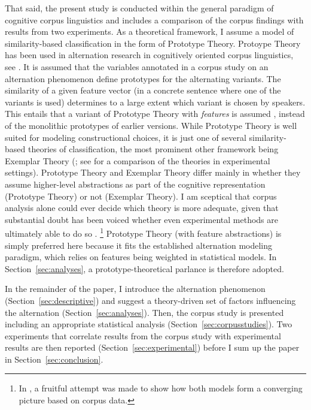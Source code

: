 \documentclass[USenglish]{article}
\begin{document}
That said, the present study is conducted within the general paradigm of cognitive corpus linguistics and includes a comparison of the corpus findings with results from two experiments.
As a theoretical framework, I assume a model of similarity-based classification in the form of Prototype Theory.
Protoype Theory has been used in alternation research in cognitively oriented corpus linguistics, see \cite{DivjakArppe2013,Gries2003}.
It is assumed that the variables annotated in a corpus study on an alternation phenomenon define prototypes for the alternating variants.
The similarity of a given feature vector (in a concrete sentence where one of the variants is used) determines to a large extent which variant is chosen by speakers.
This entails that a variant of Prototype Theory with \textit{features} is assumed \citep{Rosch1978}, instead of the monolithic prototypes of earlier versions.
While Prototype Theory is well suited for modeling constructional choices, it is just one of several similarity-based theories of classification, the most prominent other framework being Exemplar Theory (\citealp{MedinSchaffer1978,Hintzman1986}; see \citealp{StormsEa2000} for a comparison of the theories in experimental settings).
Prototype Theory and Exemplar Theory differ mainly in whether they assume higher-level abstractions as part of the cognitive representation (Prototype Theory) or not (Exemplar Theory).
I am sceptical that corpus analysis alone could ever decide which theory is more adequate, given that substantial doubt has been voiced whether even experimental methods are ultimately able to do so \citep{Barsalou1990}.%
\footnote{In \cite{DivjakArppe2013}, a fruitful attempt was made to show how both models form a converging picture based on corpus data.}
Prototype Theory (with feature abstractions) is simply preferred here because it fits the established alternation modeling paradigm, which relies on features being weighted in statistical models.
In Section~\ref{sec:analyses}, a prototype-theoretical parlance is therefore adopted.

In the remainder of the paper, I introduce the alternation phenomenon (Section~\ref{sec:descriptive}) and suggest a theory-driven set of factors influencing the alternation (Section~\ref{sec:analyses}).
Then, the corpus study is presented including an appropriate statistical analysis (Section~\ref{sec:corpusstudies}).
Two experiments that correlate results from the corpus study with experimental results are then reported (Section~\ref{sec:experimental}) before I sum up the paper in Section~\ref{sec:conclusion}.
\end{document}

